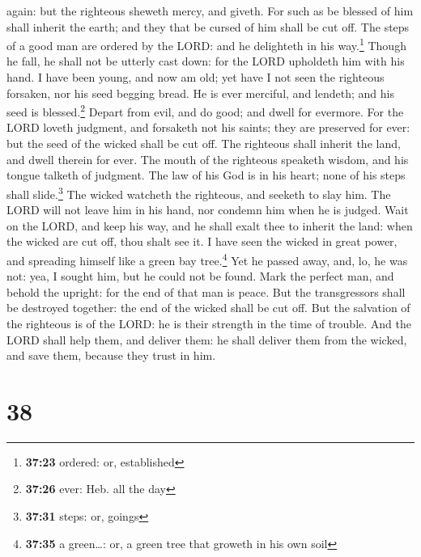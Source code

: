 again: but the righteous sheweth mercy, and giveth.  For
such as be blessed of him shall inherit the earth; and they that be
cursed of him shall be cut off.  The steps of a good man
are ordered by the LORD: and he delighteth in his way.\footnote{\textbf{37:23}
  ordered: or, established}  Though he fall, he shall not
be utterly cast down: for the LORD upholdeth him with his hand.
 I have been young, and now am old; yet have I not seen
the righteous forsaken, nor his seed begging bread.  He
is ever merciful, and lendeth; and his seed is blessed.\footnote{\textbf{37:26}
  ever: Heb. all the day}  Depart from evil, and do good;
and dwell for evermore.  For the LORD loveth judgment,
and forsaketh not his saints; they are preserved for ever: but the seed
of the wicked shall be cut off.  The righteous shall
inherit the land, and dwell therein for ever.  The mouth
of the righteous speaketh wisdom, and his tongue talketh of judgment.
 The law of his God is in his heart; none of his steps
shall slide.\footnote{\textbf{37:31} steps: or, goings} 
The wicked watcheth the righteous, and seeketh to slay him.
 The LORD will not leave him in his hand, nor condemn him
when he is judged.  Wait on the LORD, and keep his way,
and he shall exalt thee to inherit the land: when the wicked are cut
off, thou shalt see it.  I have seen the wicked in great
power, and spreading himself like a green bay tree.\footnote{\textbf{37:35}
  a green\ldots: or, a green tree that groweth in his own soil}
 Yet he passed away, and, lo, he was not: yea, I sought
him, but he could not be found.  Mark the perfect man,
and behold the upright: for the end of that man is peace.
 But the transgressors shall be destroyed together: the
end of the wicked shall be cut off.  But the salvation of
the righteous is of the LORD: he is their strength in the time of
trouble.  And the LORD shall help them, and deliver them:
he shall deliver them from the wicked, and save them, because they trust
in him.

\hypertarget{section-37}{%
\section{38}\label{section-37}}

